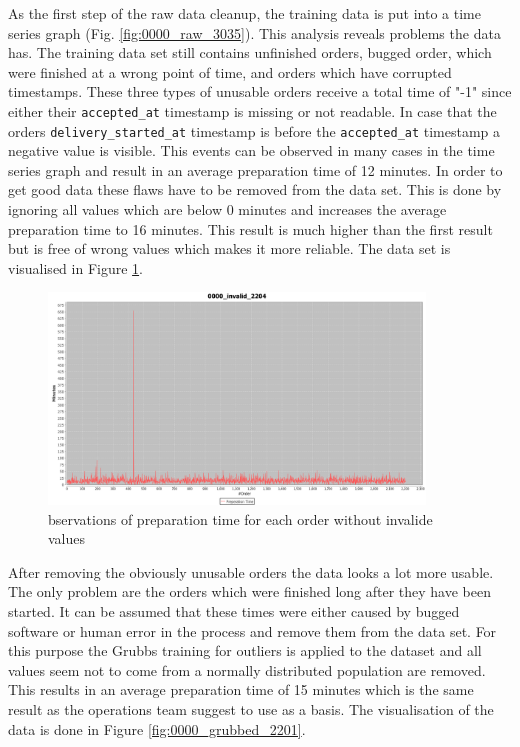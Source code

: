 As the first step of the raw data cleanup, the training data is put into a time series graph (Fig. \ref{fig:0000_raw_3035}). This analysis reveals problems the data has. The training data set still contains unfinished orders, bugged order, which were finished at a wrong point of time, and orders which have corrupted timestamps. These three types of unusable orders receive a total time of "-1" since either their \texttt{accepted\_at} timestamp is missing or not readable.  In case that the orders \texttt{delivery\_started\_at} timestamp is before the \texttt{accepted\_at} timestamp a negative value is visible. This events can be observed in many cases in the time series graph and result in an average preparation time of 12 minutes. In order to get good data these flaws have to be removed from the data set. This is done by ignoring all values which are below 0 minutes and increases the average preparation time to 16 minutes. This result is much higher than the first result but is free of wrong values which makes it more reliable. The data set is visualised in Figure \ref{fig:0000_invalid_2204}.

\begin{figure}[h]
\begin{center}
\includegraphics[width=10cm]{images/0000_invalid_2204.png}
\caption{bservations of preparation time for each order without invalide values}
\label{fig:0000_invalid_2204}
\end{center}
\end{figure}

After removing the obviously unusable orders the data looks a lot more usable. The only problem are the orders which were finished long after they have been started. It can be assumed that these times were either caused by bugged software or human error in the process and remove them from the data set. For this purpose the Grubbs training for outliers is applied to the dataset and all values seem not to come from a normally distributed population are removed. This results in an average preparation time of 15 minutes which is the same result as the operations team suggest to use as a basis. The visualisation of the data is done in Figure \ref{fig:0000_grubbed_2201}.

